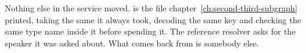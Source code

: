 %
Nothing else in the service moved.  is the file
chapter~\ref{ch:second-third-subgraph} printed, taking the same
 it always took, decoding the same key and
checking the same type name inside it before spending it. The reference
resolver asks for the speaker it was asked about. What comes back from
 is somebody else.
%
